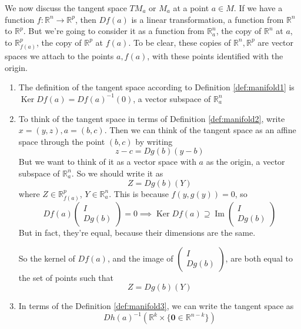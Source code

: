 \documentclass{article}
\DeclareMathOperator{\Ker}{Ker}
\DeclareMathOperator{\Ima}{Im}
\newcommand{\reals}[0]{\mathbb{R}}
\newcommand{\mb}[1]{\mathbf{#1}}
\begin{document}
We now discuss the tangent space \(TM_a\) or \(M_a\) at a point \(a \in M\). If we have a function \(f: \reals^n \to \reals^p\), then \(Df(a)\) is a linear transformation, a function from \(\reals^n\) to \(\reals^p\). But we're going to consider it as a function from \(\reals^n_a\), the copy of \(\reals^n\) at \(a\), to \(\reals^p_{f(a)}\), the copy of \(\reals^p\) at \(f(a)\). To be clear, these copies of \(\reals^n, \reals^p\) are vector spaces we attach to the points \(a, f(a)\), with these points identified with the origin.

\begin{enumerate}

  \item The definition of the tangent space according to Definition \ref{def:manifold1} is \(\Ker Df(a) = Df(a)^{-1}(0)\), a vector subspace of \(\reals^n_a\)

  \item To think of the tangent space in terms of Definition \ref{def:manifold2}, write \(x = (y, z), a = (b, c)\). Then we can think of the tangent space as an affine space through the point \((b, c)\) by writing
  \begin{equation}z - c = Dg(b)(y - b)\end{equation}
  But we want to think of it as a vector space with \(a\) as the origin, a vector subspace of \(\reals^n_a\). So we should write it as
  \begin{equation}Z = Dg(b)(Y)\end{equation}
  where \(Z \in \reals_{f(a)}^p\), \(Y \in \reals_a^n\). This is because \(f(y, g(y)) = 0\), so
  \begin{equation}Df(a)\begin{pmatrix} I \\ Dg(b) \end{pmatrix} = 0 \implies \Ker Df(a) \supseteq \Ima\begin{pmatrix} I \\ Dg(b) \end{pmatrix}\end{equation}
  But in fact, they're equal, because their dimensions are the same.

  So the kernel of \(Df(a)\), and the image of \(\begin{pmatrix} I \\ Dg(b) \end{pmatrix}\), are both equal to the set of points such that
  \begin{equation}Z = Dg(b)(Y)\end{equation}

  \item In terms of the Definition \ref{def:manifold3}, we can write the tangent space as
  \begin{equation}Dh(a)^{-1}(\reals^k \times \{\mb{0} \in \reals^{n - k}\})\end{equation}

\end{enumerate}
\end{document}

